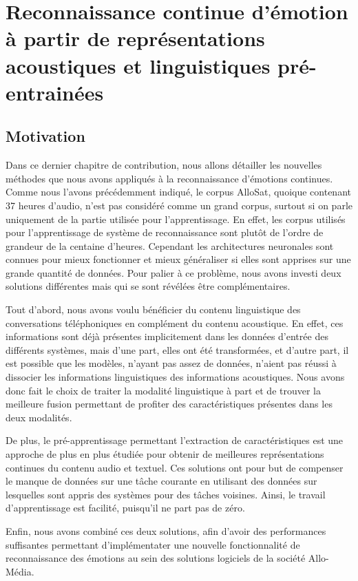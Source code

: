 \chapter{Reconnaissance continue d’émotion à partir de représentations acoustiques et linguistiques pré-entrainées}
\label{chapitre6}

\section{Motivation}

Dans ce dernier chapitre de contribution, nous allons détailler les nouvelles méthodes que nous avons appliqués à la reconnaissance d'émotions continues. Comme nous l'avons précédemment indiqué, le corpus AlloSat, quoique contenant 37 heures d'audio, n'est pas considéré comme un grand corpus, surtout si on parle uniquement de la partie utilisée pour l'apprentissage. En effet, les corpus utilisés pour l'apprentissage de système de reconnaissance sont plutôt de l'ordre de grandeur de la centaine d'heures. Cependant les architectures neuronales sont connues pour mieux fonctionner et mieux généraliser si elles sont apprises sur une grande quantité de données. Pour palier à ce problème, nous avons investi deux solutions différentes mais qui se sont révélées être complémentaires.

Tout d'abord, nous avons voulu bénéficier du contenu linguistique des conversations téléphoniques en complément du contenu acoustique.
En effet, ces informations sont déjà présentes implicitement dans les données d'entrée des différents systèmes, mais d'une part, elles ont été transformées, et d'autre part, il est possible que les modèles, n'ayant pas assez de données, n'aient pas réussi à dissocier les informations linguistiques des informations acoustiques. Nous avons donc fait le choix de traiter la modalité linguistique à part et de trouver la meilleure fusion permettant de profiter des caractéristiques présentes dans les deux modalités.

De plus, le pré-apprentissage permettant l'extraction de caractéristiques est une approche de plus en plus étudiée pour obtenir de meilleures représentations continues du contenu audio et textuel. Ces solutions ont pour but de compenser le manque de données sur une tâche courante en utilisant des données sur lesquelles sont appris des systèmes pour des tâches voisines. Ainsi, le travail d'apprentissage est facilité, puisqu'il ne part pas de zéro.

Enfin, nous avons combiné ces deux solutions, afin d'avoir des performances suffisantes permettant d'implémentater une nouvelle fonctionnalité de reconnaissance des émotions au sein des solutions logiciels de la société Allo-Média.

